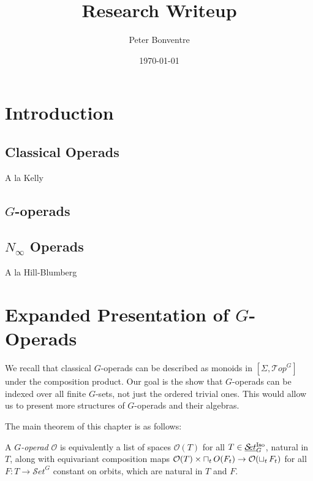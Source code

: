 \documentclass{report}
\title{Research Writeup}
\author{Peter Bonventre}
\date{\today}
\newcommand{\Top}{\text{$\mathcal{T}\!op$}}
\newcommand{\Set}{\text{$\mathcal{S}\!et$}}
\newcommand{\TopG}{\text{\underline{$\Top$}$_G$}}
\newcommand{\SetG}{\text{\underline{$\Set$}$_G^{\mbox{\scriptsize Iso}}$}}
\newcommand{\icap}{\operatornamewithlimits{\sqcap}}
\newcommand{\ico}{\operatornamewithlimits{\sqcup}}
\renewcommand{\O}{\text{$\mathcal{O}$}}
\begin{document}
\maketitle

\onehalfspacing

\tableofcontents



\chapter{Introduction}
\section{Classical Operads}
A la Kelly
\section{$G$-operads}

\section{$N_\infty$ Operads}
A la Hill-Blumberg \citep{blumberg_operadic_2013}

\chapter{Expanded Presentation of $G$-Operads}

We recall that classical $G$-operads can be described as monoids in $[\Sigma,\Top^G]$ under the composition product. Our goal is the show that $G$-operads can be indexed over all finite $G$-sets, not just the ordered trivial ones. This would allow us to present more structures of $G$-operads and their algebras.

The main theorem of this chapter is as follows:
\begin{theorem}
  A {\em $G$-operad} $\O$ is equivalently a list of spaces $\O(T)$ for all $T\in\SetG$, natural in $T$, along with equivariant composition maps $\O(T)\times\icap_tO(F_t)\to\O(\ico_tF_t)$ for all $F: T\to \Set^G$ constant on orbits, which are natural in $T$ and $F$.
\end{theorem}


\end{document}

